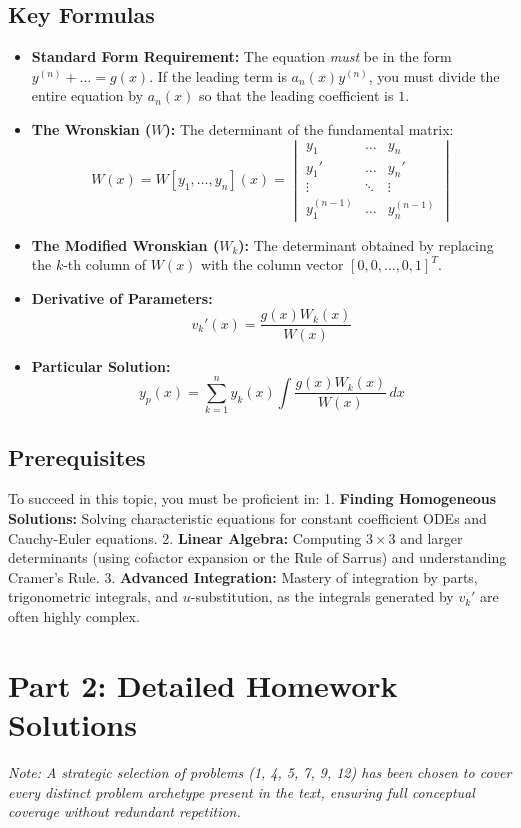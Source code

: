\documentclass[12pt]{article}
\begin{document}
\subsection{Key Formulas}
\begin{itemize}
    \item \textbf{Standard Form Requirement:} The equation \textit{must} be in the form $y^{(n)} + \dots = g(x)$. If the leading term is $a_n(x)y^{(n)}$, you must divide the entire equation by $a_n(x)$ so that the leading coefficient is $1$.
    \item \textbf{The Wronskian ($W$):} The determinant of the fundamental matrix:
    \[ W(x) = W[y_1, \dots, y_n](x) = \begin{vmatrix} y_1 & \dots & y_n \\ y_1' & \dots & y_n' \\ \vdots & \ddots & \vdots \\ y_1^{(n-1)} & \dots & y_n^{(n-1)} \end{vmatrix} \]
    \item \textbf{The Modified Wronskian ($W_k$):} The determinant obtained by replacing the $k$-th column of $W(x)$ with the column vector $[0, 0, \dots, 0, 1]^T$.
    \item \textbf{Derivative of Parameters:} 
    \[ v_k'(x) = \frac{g(x) W_k(x)}{W(x)} \]
    \item \textbf{Particular Solution:}
    \[ y_p(x) = \sum_{k=1}^n y_k(x) \int \frac{g(x) W_k(x)}{W(x)} \, dx \]
\end{itemize}

\subsection{Prerequisites}
To succeed in this topic, you must be proficient in:
1. \textbf{Finding Homogeneous Solutions:} Solving characteristic equations for constant coefficient ODEs and Cauchy-Euler equations.
2. \textbf{Linear Algebra:} Computing $3 \times 3$ and larger determinants (using cofactor expansion or the Rule of Sarrus) and understanding Cramer's Rule.
3. \textbf{Advanced Integration:} Mastery of integration by parts, trigonometric integrals, and $u$-substitution, as the integrals generated by $v_k'$ are often highly complex.

\newpage
\section{Part 2: Detailed Homework Solutions}
\textit{Note: A strategic selection of problems (1, 4, 5, 7, 9, 12) has been chosen to cover every distinct problem archetype present in the text, ensuring full conceptual coverage without redundant repetition.}
\end{document}
